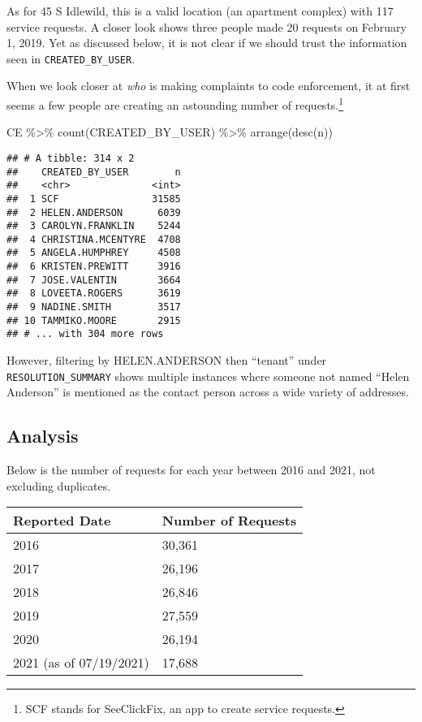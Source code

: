 \documentclass[
]{book}
\newenvironment{Shaded}{\begin{snugshade}}{\end{snugshade}}
\newcommand{\FunctionTok}[1]{\textcolor[rgb]{0.00,0.00,0.00}{#1}}
\newcommand{\NormalTok}[1]{#1}
\newcommand{\SpecialCharTok}[1]{\textcolor[rgb]{0.00,0.00,0.00}{#1}}
\begin{document}
As for 45 S Idlewild, this is a valid location (an apartment complex) with 117 service requests. A closer look shows three people made 20 requests on February 1, 2019. Yet as discussed below, it is not clear if we should trust the information seen in \texttt{CREATED\_BY\_USER}.

When we look closer at \emph{who} is making complaints to code enforcement, it at first seems a few people are creating an astounding number of requests.\footnote{SCF stands for SeeClickFix, an app to create service requests.}

\begin{Shaded}
\begin{Highlighting}[]
\NormalTok{CE }\SpecialCharTok{\%\textgreater{}\%} \FunctionTok{count}\NormalTok{(CREATED\_BY\_USER) }\SpecialCharTok{\%\textgreater{}\%} \FunctionTok{arrange}\NormalTok{(}\FunctionTok{desc}\NormalTok{(n))}
\end{Highlighting}
\end{Shaded}

\begin{verbatim}
## # A tibble: 314 x 2
##    CREATED_BY_USER        n
##    <chr>              <int>
##  1 SCF                31585
##  2 HELEN.ANDERSON      6039
##  3 CAROLYN.FRANKLIN    5244
##  4 CHRISTINA.MCENTYRE  4708
##  5 ANGELA.HUMPHREY     4508
##  6 KRISTEN.PREWITT     3916
##  7 JOSE.VALENTIN       3664
##  8 LOVEETA.ROGERS      3619
##  9 NADINE.SMITH        3517
## 10 TAMMIKO.MOORE       2915
## # ... with 304 more rows
\end{verbatim}

However, filtering by HELEN.ANDERSON then ``tenant'' under \texttt{RESOLUTION\_SUMMARY} shows multiple instances where someone not named ``Helen Anderson'' is mentioned as the contact person across a wide variety of addresses.

\hypertarget{analysis}{%
\subsection{Analysis}\label{analysis}}

Below is the number of requests for each year between 2016 and 2021, not excluding duplicates.

\begin{longtable}[]{@{}ll@{}}
\toprule
Reported Date & Number of Requests \\
\midrule
\endhead
2016 & 30,361 \\
2017 & 26,196 \\
2018 & 26,846 \\
2019 & 27,559 \\
2020 & 26,194 \\
2021 (as of 07/19/2021) & 17,688 \\
\bottomrule
\end{longtable}
\end{document}
